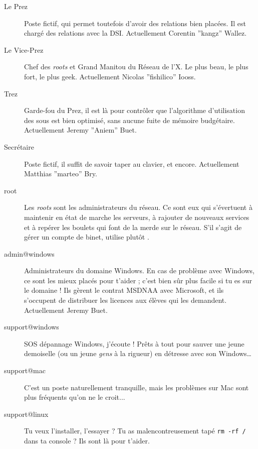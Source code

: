 \begin{description}

  \item[Le Prez]{Poste fictif, qui permet toutefois d'avoir des relations bien plac\'ees. Il est chargé des relations avec la DSI. Actuellement Corentin ''kangz'' Wallez.}
  
  \item[Le Vice-Prez]{Chef des \emph{roots} et Grand Manitou du Réseau de l'X. Le plus beau, le plus fort, le plus geek. Actuellement Nicolas ''fishilico'' Iooss.}

  \item[Trez]{Garde-fou du Prez, il est là pour contrôler que l'algorithme d'utilisation des sous est bien optimisé, sans aucune fuite de mémoire budgétaire. Actuellement Jeremy ''Aniem'' Buet.}

  \item[Secrétaire]{Poste fictif, il suffit de savoir taper au clavier, et encore. Actuellement Matthias ''marteo'' Bry.}

  \item[root]{Les \emph{roots} sont les administrateurs du r\'eseau. Ce sont eux qui s'\'evertuent \`a maintenir en \'etat de marche les serveurs, \`a rajouter de 
  nouveaux services et \`a rep\'erer les boulets qui font de la merde sur le r\'eseau. S'il s'agit de g\'erer un compte de binet, utilise plut\^ot .}

  \item[admin@windows] {Administrateurs du domaine Windows. En cas de probl\`eme avec Windows, ce sont les mieux plac\'es pour t'aider ;
  c'est bien s\^ur  plus facile si tu es sur le domaine ! Ils gèrent le contrat
  MSDNAA avec Microsoft, et ils s'occupent de distribuer les licences aux élèves qui les demandent. Actuellement Jeremy Buet.}
  
  \item[support@windows] {SOS d\'epannage Windows, j'\'ecoute ! Pr\^ets \`a tout pour sauver une jeune demoiselle (ou un jeune \emph{gens} \`a la rigueur) en d\'etresse avec son Windows\dots }

  \item[support@mac] {C'est un poste naturellement tranquille, mais les problèmes sur Mac sont plus fréquents qu'on ne le croit... }
  
  \item[support@linux] {Tu veux l'installer, l'essayer ? Tu as malencontreusement tapé \texttt{rm -rf /} dans ta console ? Ils sont là pour t'aider.}
  

\end{description}
